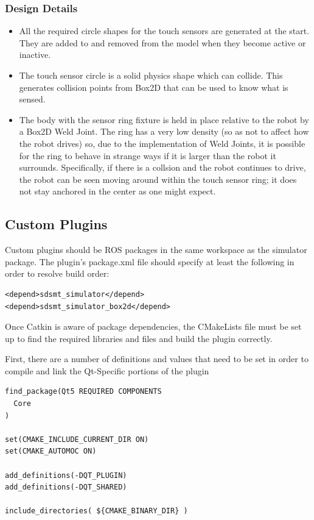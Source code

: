 \begin{itemize}
\subsubsection*{Design Details}
\begin{itemize}
	\item All the required circle shapes for the touch sensors are generated at the start. They are added to and removed from the model when they become active or inactive.
	\item The touch sensor circle is a solid physics shape which can collide. This generates collision points from Box2D that can be used to know what is sensed.
	\item The body with the sensor ring fixture is held in place relative to the robot by a Box2D Weld Joint. The ring has a very low density (so as not to affect how the robot drives) so, due to the implementation of Weld Joints,  it is possible for the ring to behave in strange ways if it is larger than the robot it surrounds. Specifically, if there is a collsion and the robot continues to drive, the robot can be seen moving around within the touch sensor ring; it does not stay anchored in the center as one might expect.
\end{itemize}
\subsection{Custom Plugins}
Custom plugins should be ROS packages in the same workspace as the simulator package. The plugin's package.xml file should specify at least the following in order to resolve build order:
\begin{lstlisting}
<depend>sdsmt_simulator</depend>
<depend>sdsmt_simulator_box2d</depend>
\end{lstlisting}

Once Catkin is aware of package dependencies, the CMakeLists file must be set up to find the required libraries and files and build the plugin correctly.

First, there are a number of definitions and values that need to be set in order to compile and link the Qt-Specific portions of the plugin
\begin{lstlisting}
find_package(Qt5 REQUIRED COMPONENTS
  Core
)

set(CMAKE_INCLUDE_CURRENT_DIR ON)
set(CMAKE_AUTOMOC ON)

add_definitions(-DQT_PLUGIN)
add_definitions(-DQT_SHARED)

include_directories( ${CMAKE_BINARY_DIR} )
\end{lstlisting}


\end{itemize}
